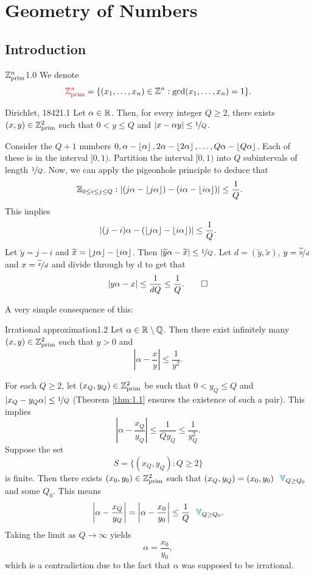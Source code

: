 \documentclass{Vorlesungstemplate_English} %
\begin{document}
\chapter{Geometry of Numbers}
\section{Introduction}
\begin{definition}{$\mathbb{Z}_{\text{prim}}^{n}$}{1.0}
  We denote
  \[ \index{$\Zprim{n}$} {\color{red} \Zprim{n}} = \{ (x_1, \dots, x_n) \in \Z^n : \gcd(x_1, \dots, x_n) = 1\}.\]
\end{definition}
\begin{theorem}{Dirichlet, 1842}{1.1}
  Let $\alpha \in \mathbb{R}$. Then, for every integer $Q \geq 2$, there exists $(x,y) \in \mathbb{Z}_{\text{prim}}^{2}$ such that $0 < y \leq Q$ and $|x-\alpha y| \leq \nicefrac{1}{Q}$.
\end{theorem}
\begin{pf}
  Consider the $Q+1$ numbers $0, \alpha-\left\lfloor\alpha\right\rfloor, 2\alpha-\left\lfloor 2\alpha\right\rfloor, \dots, Q\alpha-\left\lfloor Q\alpha\right\rfloor$. Each of these is in the interval $[0,1)$. Partition the interval $[0,1)$ into $Q$ subintervals of length $\nicefrac{1}{Q}$. Now, we can apply the pigeonhole principle to deduce that
  \[\exists_{0 \leq i \leq j \leq Q}: |(j\alpha-\lf j\alpha\rf)-(i\alpha-\lf i\alpha\rf)| \leq \frac{1}{Q}.\]
  This implies
  \[ |(j-i)\alpha - (\left\lfloor j\alpha\right\rfloor -\left\lfloor i\alpha\right\rfloor)| \leq \frac{1}{Q}.\]
  Let $\widetilde{y} = j-i$ and $\widetilde{x} = \left\lfloor j\alpha\right\rfloor - \left\lfloor i\alpha \right\rfloor$. Then $|\widetilde{y}\alpha-\widetilde{x}| \leq \nicefrac{1}{Q}$. Let $d = (\widetilde{y}, \widetilde{x})$, $y = \nicefrac{\widetilde{y}}{d}$ and $x = \nicefrac{\widetilde{x}}{d}$ and divide through by d to get that
  \[ |y\alpha-x| \leq \frac{1}{dQ} \leq \frac{1}{Q}. \qedhere\]
\end{pf}
A very simple consequence of this:
\begin{corollary}{Irrational approximation}{1.2}
  Let $\alpha \in \mathbb{R} \setminus \mathbb{Q}$. Then there exist infinitely many $(x,y) \in \mathbb{Z}_{\text{prim}}^{2}$ such that $y > 0$ and
  \[ \left|\alpha-\frac{x}{y}\right| \leq \frac{1}{y^2}.\]
\end{corollary}
\begin{pf}
  For each $Q \geq 2$, let $(x_Q, y_Q) \in \mathbb{Z}_{\text{prim}}^{2}$ be such that $0 < y_Q \leq Q$ and $|x_Q-y_Q\alpha| \leq \nicefrac{1}{Q}$ (Theorem \ref{thm:1.1} ensures the existence of such a pair). This implies
  \[ \left| \alpha-\frac{x_Q}{y_Q}\right| \leq \frac{1}{Qy_Q} \leq \frac{1}{y_Q^2}.\]
  Suppose the set
  \[ S = \{ (x_Q,y_Q): Q \geq 2\}\]
  is finite. Then there exists $(x_0,y_0) \in \mathbb{Z}_{\text{prim}}^{2}$ such that $(x_Q,y_Q) = (x_0,y_0) \jubelforall_{Q \geq Q_0}$ and some $Q_0$. This means
  \[ \left| \alpha-\frac{x_Q}{y_Q}\right| = \left| \alpha - \frac{x_0}{y_0}\right| \leq \frac{1}{Q} \jubelforall_{Q \geq Q_0}.\]
  Taking the limit as $Q \to \infty$ yields
  \[ \alpha = \frac{x_0}{y_0},\]
  which is a contradiction due to the fact that $\alpha$ was supposed to be irrational. \Lightning
\end{pf}
\end{document}
